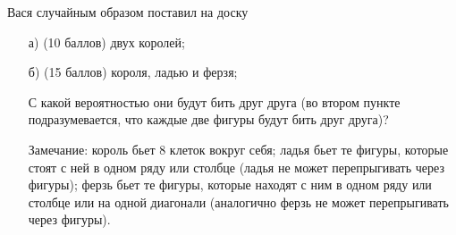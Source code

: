 
Вася случайным образом поставил на доску 

\begin{enumerate}
	\item[а)] (10 баллов) двух королей;
	\item[б)] (15 баллов) короля, ладью и ферзя;
	
	С какой вероятностью они будут бить друг друга (во втором пункте 
	подразумевается, что каждые две фигуры будут бить друг друга)?
	
	Замечание: король бьет $8$ клеток вокруг себя; ладья бьет
	те фигуры, которые стоят с ней в одном ряду или столбце
	(ладья не может перепрыгивать через фигуры); ферзь бьет
	те фигуры, которые находят с ним в одном ряду или столбце 
	или на одной диагонали (аналогично ферзь не может 
    перепрыгивать через фигуры).
    
\end{enumerate}